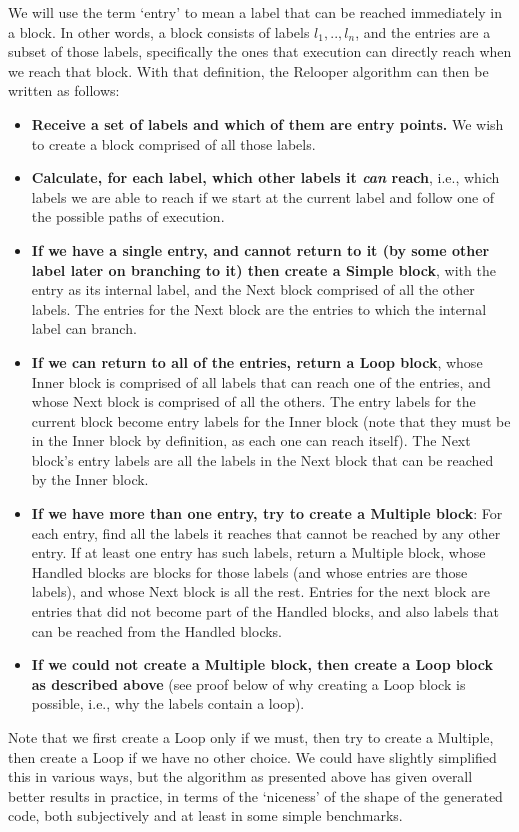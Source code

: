 \documentclass[11pt]{proc}
\begin{document}
We will use the term `entry' to
mean a label that can be reached immediately in a block. In other
words, a block consists of labels $l_1,..,l_n$, and the entries
are a subset of those labels, specifically the ones that execution
can directly reach when we reach that block. With that
definition, the Relooper algorithm can
then be written as follows:

\begin{itemize}
\item \textbf{Receive a set of labels and which of them are entry points.}
      We wish to create a block comprised of all those labels.
\item \textbf{Calculate, for each label, which other labels it \emph{can}
      reach}, i.e., which labels we are able to reach if we start
      at the current label and follow one of the possible paths
      of execution.
\item \textbf{If we have a single entry, and cannot return to it (by some other
      label later on branching to it) then create a Simple block}, with the entry
      as its internal label, and the Next block comprised of all
      the other labels. The entries for the Next block are the entries
      to which the internal label can branch.
\item \textbf{If we can return to all of the entries, return a
      Loop block}, whose Inner block is comprised of all labels that
      can reach one of the entries, and whose Next block is
      comprised of all the others. The entry labels for the current
      block become entry labels for the Inner block (note that
      they must be in the Inner block by definition, as each one can reach
      itself). The Next block's entry labels are all the labels
      in the Next block that can be reached by the Inner block.
\item \textbf{If we have more than one entry, try to create a Multiple block}: For each entry, find all
      the labels it reaches that cannot be reached by any other
      entry. If at least one entry has such labels, return a
      Multiple block, whose Handled blocks are blocks for those
      labels (and whose entries are those labels), and whose Next block is all the rest.
      Entries for the next block are entries that did not become part of the Handled
      blocks, and also labels that can be reached from the Handled blocks.
\item \textbf{If we could not create a Multiple block, then create a Loop block as described above}
      (see proof below of why creating a Loop block is possible, i.e., why the labels contain a loop).
\end{itemize}
Note that we first create a Loop only if we must, then try to create a
Multiple, then create a Loop if we have no other choice. We could have slightly simplified this in
various ways, but the algorithm as presented above has given overall better
results in practice, in terms of the `niceness' of the shape of the
generated code, both subjectively and at least in some simple benchmarks.
\end{document}
